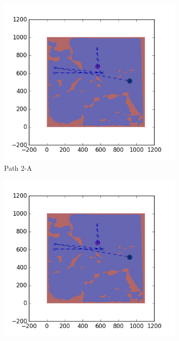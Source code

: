 \documentclass{tamuccthesis}
\begin{document}
\begin{figure}
\begin{subfigure}[b]{0.24\textwidth}
        \includegraphics[width=\textwidth,trim={4cm 3cm 2cm 3cm},clip]{EXP3RG_PathBa_-1_-1_0d001_0d01.png}
        \caption{Path 2-A}
        \label{fig:Path_2-A_upReward_upWork}
    \end{subfigure}
    \begin{subfigure}[b]{0.24\textwidth}
        \centering
        \includegraphics[width=\textwidth,trim={4cm 3cm 2cm 3cm},clip]{EXP3RG_PathBa_-1_-1_0d001_0d01.png}

\end{subfigure}
\end{figure}
\end{document}
